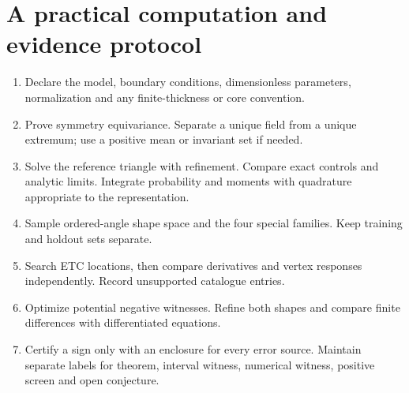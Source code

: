 \documentclass[11pt,oneside,openany]{book}
\begin{document}
\section{A practical computation and evidence protocol}
\begin{enumerate}
\item Declare the model, boundary conditions, dimensionless parameters,
normalization and any finite-thickness or core convention.
\item Prove symmetry equivariance. Separate a unique field from a
unique extremum; use a positive mean or invariant set if needed.
\item Solve the reference triangle with refinement. Compare exact
controls and analytic limits. Integrate probability and moments
with quadrature appropriate to the representation.
\item Sample ordered-angle shape space and the four special families.
Keep training and holdout sets separate.
\item Search ETC locations, then compare derivatives and vertex
responses independently. Record unsupported catalogue entries.
\item Optimize potential negative witnesses. Refine both shapes
and compare finite differences with differentiated equations.
\item Certify a sign only with an enclosure for every error source.
Maintain separate labels for theorem, interval witness, numerical
witness, positive screen and open conjecture.
\end{enumerate}
\end{document}
